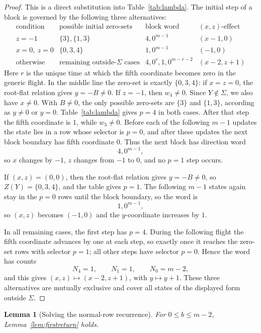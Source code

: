 \documentclass[11pt]{article}
\newtheorem{lemma}{Lemma}
\theoremstyle{definition}
\begin{document}
\begin{proof}
This is a direct substitution into Table~\ref{tab:lambda}.  The initial step of a block is governed by
the following three alternatives:
\[
\begin{array}{c|c|c|c}
\text{condition} & \text{possible initial zero-sets} & \text{block word} & (x,z)\text{-effect}\\
\hline
z=-1 & \{3\},\{1,3\} & 4,0^{m-1} & (x-1,0)\\
x=0,\ z=0 & \{0,3,4\} & 1,0^{m-1} & (-1,0)\\
\text{otherwise} & \text{remaining outside-}\Sigma\text{ cases} & 4,0^{r},1,0^{m-r-2} & (x-2,z+1)
\end{array}
\]
Here \(r\) is the unique time at which the fifth coordinate becomes zero in the generic flight.
In the middle line the zero-set is exactly \(\{0,3,4\}\): if \(x=z=0\), the root-flat relation gives
\(y=-B\ne0\).
If \(z=-1\), then \(w_4\ne0\).  Since
\(Y\notin\Sigma\), we also have \(x\ne0\).  With \(B\ne0\), the only possible zero-sets are
\(\{3\}\) and \(\{1,3\}\), according as \(y\ne0\) or \(y=0\).  Table~\ref{tab:lambda} gives \(p=4\) in
both cases.  After that step the fifth coordinate is \(1\), while \(w_3\ne0\).  Before each of the
following \(m-1\) updates the state lies in a row whose selector is \(p=0\), and after these updates
the next block boundary has fifth coordinate \(0\).  Thus the next block has direction
word
\[
4,0^{m-1},
\]
so \(x\) changes by \(-1\), \(z\) changes from \(-1\) to \(0\), and no \(p=1\) step occurs.

If \((x,z)=(0,0)\), then the root-flat relation gives \(y=-B\ne0\), so
\(Z(Y)=\{0,3,4\}\), and the table gives \(p=1\).  The following \(m-1\)
states again stay in the \(p=0\) rows until the block boundary, so the word is
\[
1,0^{m-1},
\]
so \((x,z)\) becomes \((-1,0)\) and the \(y\)-coordinate increases by \(1\).

In all remaining cases, the first step has \(p=4\).  During the following flight the fifth coordinate
advances by one at each step, so exactly once it reaches the zero-set rows with selector \(p=1\); all
other steps have selector \(p=0\).  Hence the word has counts
\[
N_4=1,\qquad N_1=1,\qquad N_0=m-2,
\]
and this gives \((x,z)\mapsto(x-2,z+1)\), with \(y\mapsto y+1\).  These three alternatives are
mutually exclusive and cover all states of the displayed form outside \(\Sigma\).
\end{proof}

\begin{lemma}[Solving the normal-row recurrence]\label{lem:normalrowsolved}
For \(0\le b\le m-2\), Lemma~\ref{lem:firstreturn} holds.
\end{lemma}
\end{document}
